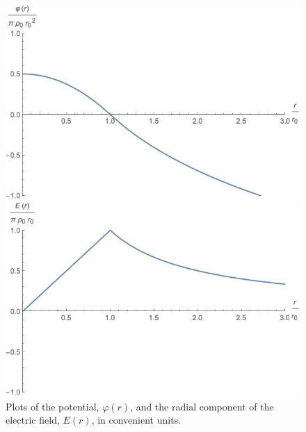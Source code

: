 \documentclass[]{book}
\begin{document}
\begin{frame}{}
    \begin{figure}[h]
        \begin{minipage}[b]{0.5\linewidth}
            \centering
            \includegraphics[width=\textwidth]{2Ddiscpotential.jpeg}
        \end{minipage}
        \hspace{0.5cm}
        \begin{minipage}[b]{0.5\linewidth}
            \centering
            \includegraphics[width=\textwidth]{2DdiscEfield.jpeg}
        \end{minipage}
        \caption{Plots of the potential, $\varphi(r)$, and the radial component of the electric field, $E(r)$, in convenient units.}
    \end{figure}
\end{frame}
\end{document}
